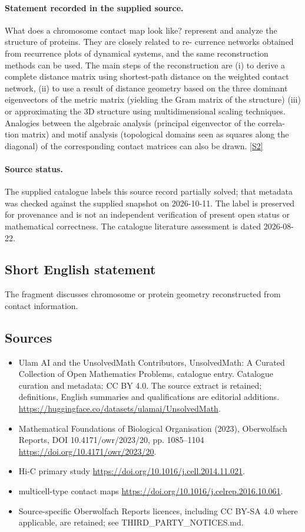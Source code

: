 \documentclass[11pt]{article}
\begin{document}
\paragraph{Statement recorded in the supplied source.}
What does a chromosome contact map look like? represent and analyze the structure of proteins. They are closely related to re- currence networks obtained from recurrence plots of dynamical systems, and the same reconstruction methods can be used. The main steps of the reconstruction are (i) to derive a complete distance matrix using shortest-path distance on the weighted contact network, (ii) to use a result of distance geometry based on the three dominant eigenvectors of the metric matrix (yielding the Gram matrix of the structure) (iii) or approximating the 3D structure using multidimensional scaling techniques. Analogies between the algebraic analysis (principal eigenvector of the correla- tion matrix) and motif analysis (topological domains seen as squares along the diagonal) of the corresponding contact matrices can also be drawn. \href{https://doi.org/10.4171/owr/2023/20}{[S2]}
\paragraph{Source status.}
The supplied catalogue labels this source record partially solved; that metadata was checked against the supplied snapshot on 2026-10-11. The label is preserved for provenance and is not an independent verification of present open status or mathematical correctness. The catalogue literature assessment is dated 2026-08-22.
\subsection{Short English statement}
The fragment discusses chromosome or protein geometry reconstructed from contact information.
\subsection{Sources}
\begin{itemize}
\item[S1] Ulam AI and the UnsolvedMath Contributors, UnsolvedMath: A Curated Collection of Open Mathematics Problems, catalogue entry. Catalogue curation and metadata: CC BY 4.0. The source extract is retained; definitions, English summaries and qualifications are editorial additions.
\url{https://huggingface.co/datasets/ulamai/UnsolvedMath}.
\item[S2] Mathematical Foundations of Biological Organisation (2023), Oberwolfach Reports, DOI 10.4171/owr/2023/20, pp. 1085--1104
\url{https://doi.org/10.4171/owr/2023/20}.
\item[S3] Hi-C primary study
\url{https://doi.org/10.1016/j.cell.2014.11.021}.
\item[S4] multicell-type contact maps
\url{https://doi.org/10.1016/j.celrep.2016.10.061}.
\item Source-specific Oberwolfach Reports licences, including CC BY-SA 4.0 where applicable, are retained; see THIRD\_PARTY\_NOTICES.md.
\end{itemize}
\end{document}
